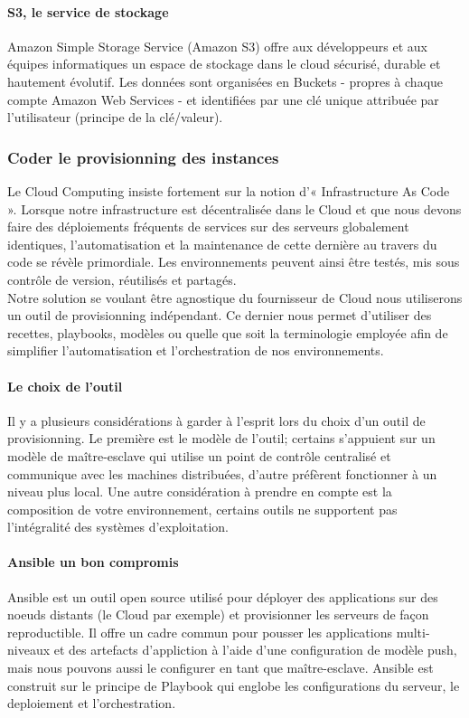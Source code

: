           \paragraph{S3, le service de stockage}
          Amazon Simple Storage Service (Amazon S3) offre aux développeurs et aux équipes informatiques un espace de stockage dans le cloud sécurisé, durable et hautement évolutif. Les données sont organisées en Buckets - propres à chaque compte Amazon Web Services - et identifiées par une clé unique attribuée par l'utilisateur (principe de la clé/valeur).

        \subsubsection{Coder le provisionning des instances}
        Le Cloud Computing insiste fortement sur la notion d'« Infrastructure As Code ». Lorsque notre infrastructure est décentralisée dans le Cloud et que nous devons faire des déploiements fréquents de services sur des serveurs globalement identiques, l'automatisation et la maintenance de cette dernière au travers du code se révèle primordiale. Les environnements peuvent ainsi être testés, mis sous contrôle de version, réutilisés et partagés.\\

        Notre solution se voulant être agnostique du fournisseur de Cloud nous utiliserons un outil de provisionning indépendant. Ce dernier nous permet d'utiliser des recettes, playbooks, modèles ou quelle que soit la terminologie employée afin de simplifier l'automatisation et l'orchestration de nos environnements.

          \paragraph{Le choix de l'outil}
          Il y a plusieurs considérations à garder à l'esprit lors du choix d'un outil de provisionning. Le première est le modèle de l'outil; certains s'appuient sur un modèle de maître-esclave qui utilise un point de contrôle centralisé et communique avec les machines distribuées, d'autre préfèrent fonctionner à un niveau plus local. Une autre considération à prendre en compte est la composition de votre environnement, certains outils ne supportent pas l'intégralité des systèmes d'exploitation.

          \paragraph{Ansible un bon compromis}\label{Ansible}
          Ansible est un outil open source utilisé pour déployer des applications sur des noeuds distants (le Cloud par exemple) et provisionner les serveurs de façon reproductible. Il offre un cadre commun pour pousser les applications multi-niveaux et des artefacts d'appliction à l'aide d'une configuration de modèle push, mais nous pouvons aussi le configurer en tant que maître-esclave. Ansible est construit sur le principe de Playbook qui englobe les configurations du serveur, le deploiement et l'orchestration.\\

